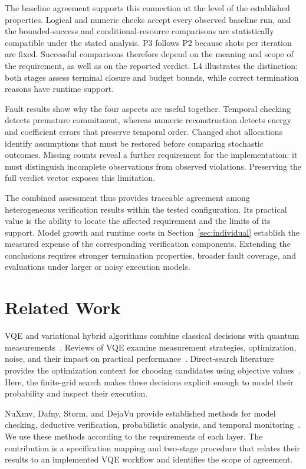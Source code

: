 \documentclass[conference]{IEEEtran}
\begin{document}
The baseline agreement supports this connection at the level of the established properties. Logical and numeric checks accept every observed baseline run, and the bounded-success and conditional-resource comparisons are statistically compatible under the stated analysis. P3 follows P2 because shots per iteration are fixed. Successful comparisons therefore depend on the meaning and scope of the requirement, as well as on the reported verdict. L4 illustrates the distinction: both stages assess terminal closure and budget bounds, while correct termination reasons have runtime support.

Fault results show why the four aspects are useful together. Temporal checking detects premature commitment, whereas numeric reconstruction detects energy and coefficient errors that preserve temporal order. Changed shot allocations identify assumptions that must be restored before comparing stochastic outcomes. Missing counts reveal a further requirement for the implementation: it must distinguish incomplete observations from observed violations. Preserving the full verdict vector exposes this limitation.

The combined assessment thus provides traceable agreement among heterogeneous verification results within the tested configuration. Its practical value is the ability to locate the affected requirement and the limits of its support. Model growth and runtime costs in Section~\ref{sec:individual} establish the measured expense of the corresponding verification components. Extending the conclusions requires stronger termination properties, broader fault coverage, and evaluations under larger or noisy execution models.

\section{Related Work}
VQE and variational hybrid algorithms combine classical decisions with quantum measurements~\cite{peruzzo2014,mcclean2016}. Reviews of VQE examine measurement strategies, optimization, noise, and their impact on practical performance~\cite{tilly2022}. Direct-search literature provides the optimization context for choosing candidates using objective values~\cite{kolda2003}. Here, the finite-grid search makes these decisions explicit enough to model their probability and inspect their execution.

NuXmv, Dafny, Storm, and DejaVu provide established methods for model checking, deductive verification, probabilistic analysis, and temporal monitoring~\cite{nuxmv,dafny,storm,dejavu}. We use these methods according to the requirements of each layer. The contribution is a specification mapping and two-stage procedure that relates their results to an implemented VQE workflow and identifies the scope of agreement.
\end{document}
